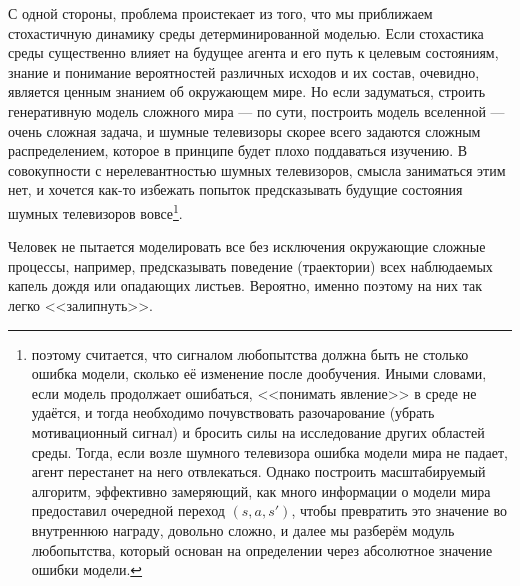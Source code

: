 С одной стороны, проблема проистекает из того, что мы приближаем стохастичную динамику среды детерминированной моделью. Если стохастика среды существенно влияет на будущее агента и его путь к целевым состояниям, знание и понимание вероятностей различных исходов и их состав, очевидно, является ценным знанием об окружающем мире. Но если задуматься, строить генеративную модель сложного мира --- по сути, построить модель вселенной --- очень сложная задача, и шумные телевизоры скорее всего задаются сложным распределением, которое в принципе будет плохо поддаваться изучению. В совокупности с нерелевантностью шумных телевизоров, смысла заниматься этим нет, и хочется как-то избежать попыток предсказывать будущие состояния шумных телевизоров вовсе\footnote{поэтому считается, что сигналом любопытства должна быть не столько ошибка модели, сколько её изменение после дообучения. Иными словами, если модель продолжает ошибаться, <<понимать явление>> в среде не удаётся, и тогда необходимо почувствовать разочарование (убрать мотивационный сигнал) и бросить силы на исследование других областей среды. Тогда, если возле шумного телевизора ошибка модели мира не падает, агент перестанет на него отвлекаться. Однако построить масштабируемый алгоритм, эффективно замеряющий, как много информации о модели мира предоставил очередной переход $(s, a, s')$, чтобы превратить это значение во внутреннюю награду, довольно сложно, и далее мы разберём модуль любопытства, который основан на определении через абсолютное значение ошибки модели.}.

\begin{example}
Человек не пытается моделировать все без исключения окружающие сложные процессы, например, предсказывать поведение (траектории) всех наблюдаемых капель дождя или опадающих листьев. Вероятно, именно поэтому на них так легко <<залипнуть>>.
\end{example}


